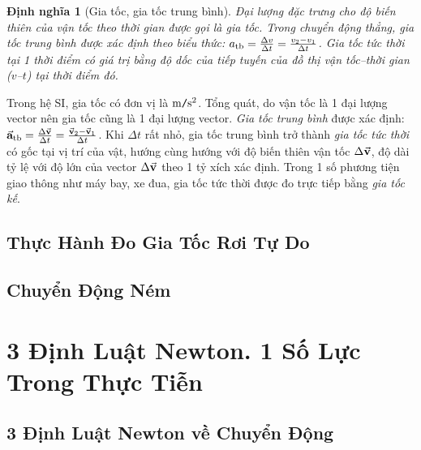 \documentclass{article}
\numberwithin{equation}{section}
\newtheorem{dinhnghia}{Định nghĩa}[section]
\begin{document}
\begin{dinhnghia}[Gia tốc, gia tốc trung bình]
	Đại lượng đặc trưng cho độ biến thiên của vận tốc theo thời gian được gọi là \emph{gia tốc}. Trong chuyển động thẳng, \emph{gia tốc trung bình} được xác định theo biểu thức: $a_{\rm tb} = \frac{\Delta v}{\Delta t} = \frac{v_2 - v_1}{\Delta t}$. Gia tốc tức thời tại 1 thời điểm có giá trị bằng độ dốc của tiếp tuyến của đồ thị vận tốc--thời gian ($v$--$t$) tại thời điểm đó.
\end{dinhnghia}
Trong hệ SI, gia tốc có đơn vị là $\rm m\texttt{/}s^2$. Tổng quát, do vận tốc là 1 đại lượng vector nên gia tốc cũng là 1 đại lượng vector. \emph{Gia tốc trung bình} được xác định: $\vec{\bf a}_{\rm tb} = \frac{\Delta\vec{\bf v}}{\Delta t} = \frac{\vec{\bf v}_2 - \vec{\bf v}_1}{\Delta t}$. Khi $\Delta t$ rất nhỏ, gia tốc trung bình trở thành \textit{gia tốc tức thời} có gốc tại vị trí của vật, hướng cùng hướng với độ biến thiên vận tốc $\Delta\vec{\bf v}$, độ dài tỷ lệ với độ lớn của vector $\Delta\vec{\bf v}$ theo 1 tỷ xích xác định. Trong 1 số phương tiện giao thông như máy bay, xe đua, gia tốc tức thời được đo trực tiếp bằng \textit{gia tốc kế}. 


\subsection{Thực Hành Đo Gia Tốc Rơi Tự Do}


\subsection{Chuyển Động Ném}


\section{3 Định Luật Newton. 1 Số Lực Trong Thực Tiễn}

\subsection{3 Định Luật Newton về Chuyển Động}

\end{document}
